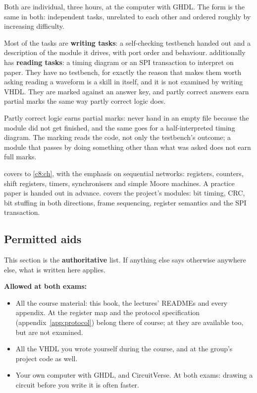 Both are individual, three hours, at the computer with GHDL. The form is the same in both:
independent tasks, unrelated to each other and ordered roughly by increasing difficulty.

Most of the tasks are \textbf{writing tasks}: a self-checking testbench handed out and a description
of the module it drives, with port order and behaviour.  additionally has
\textbf{reading tasks}: a timing diagram or an SPI transaction to interpret on paper. They have no
testbench, for exactly the reason that makes them worth asking \textemdash{} reading a waveform is a
skill in itself, and it is not examined by writing VHDL. They are marked against an answer key, and
partly correct answers earn partial marks the same way partly correct logic does.

Partly correct logic earns partial marks: never hand in an empty file because the module did not get
finished, and the same goes for a half-interpreted timing diagram. The marking reads the code, not
only the testbench's outcome; a module that passes by doing something other than what was asked does
not earn full marks.

 covers  to \ref{c8:ch}, with the emphasis on sequential networks:
registers, counters, shift registers, timers, synchronisers and simple Moore machines. A practice
paper is handed out in advance.  covers the project's modules: bit timing, CRC, bit
stuffing in both directions, frame sequencing, register semantics and the SPI transaction.

\subsection{Permitted aids}
\label{app:project:aids}

This section is the \textbf{authoritative} list. If anything else says otherwise anywhere else, what
is written here applies.

\textbf{Allowed at both exams:}
\begin{itemize}
  \item All the course material: this book, the lectures' READMEs and every appendix. At
     the register map and the protocol specification (appendix~\ref{app:protocol})
    belong there of course; at  they are available too, but are not examined.
  \item All the VHDL you wrote yourself during the course, and at  the group's
    project code as well.
  \item Your own computer with GHDL, and CircuitVerse. At both exams: drawing a circuit before you
    write it is often faster.
\end{itemize}

